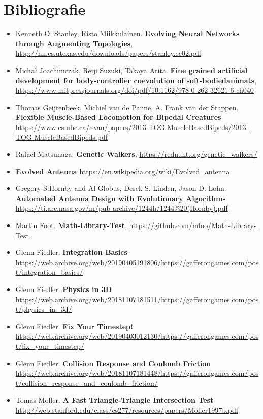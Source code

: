 \chapter*{Bibliografie} 

\begin{itemize}
    \item Kenneth O. Stanley, Risto Miikkulainen. \textbf{Evolving Neural Networks through Augmenting Topologies}, \url{http://nn.cs.utexas.edu/downloads/papers/stanley.ec02.pdf}
    \item Michał Joachimczak, Reiji Suzuki,  Takaya Arita. \textbf{Fine grained artificial development for body-controller coevolution of soft-bodiedanimats}, \url{https://www.mitpressjournals.org/doi/pdf/10.1162/978-0-262-32621-6-ch040}
    \item Thomas Geijtenbeek, Michiel van de Panne, A. Frank van der Stappen. \textbf{Flexible Muscle-Based Locomotion for Bipedal Creatures} \url {https://www.cs.ubc.ca/~van/papers/2013-TOG-MuscleBasedBipeds/2013-TOG-MuscleBasedBipeds.pdf}
    \item Rafael Matsunaga. \textbf{Genetic Walkers}, \url{https://rednuht.org/genetic_walkers/}
    \item \textbf{Evolved Antenna} \url{https://en.wikipedia.org/wiki/Evolved_antenna}
    \item Gregory S.Hornby and Al Globus, Derek S. Linden, Jason D. Lohn. \textbf{Automated Antenna Design with Evolutionary Algorithms} \url{https://ti.arc.nasa.gov/m/pub-archive/1244h/1244%20(Hornby).pdf}
    \item Martin Foot. \textbf{Math-Library-Test}, \url{https://github.com/mfoo/Math-Library-Test}
    \item Glenn Fiedler. \textbf{Integration Basics} \url{https://web.archive.org/web/20190405191806/https://gafferongames.com/post/integration_basics/}
    \item Glenn Fiedler. \textbf{Physics in 3D} \url{https://web.archive.org/web/20181107181511/https://gafferongames.com/post/physics_in_3d/}
    \item Glenn Fiedler. \textbf{Fix Your Timestep!} \url{https://web.archive.org/web/20190403012130/https://gafferongames.com/post/fix_your_timestep/}
    \item Glenn Fiedler. \textbf{Collision Response and Coulomb Friction} \url{https://web.archive.org/web/20181107181448/https://gafferongames.com/post/collision_response_and_coulomb_friction/}
    \item Tomas Moller. \textbf{A Fast Triangle-Triangle Intersection Test} \url{http://web.stanford.edu/class/cs277/resources/papers/Moller1997b.pdf}
\end{itemize}